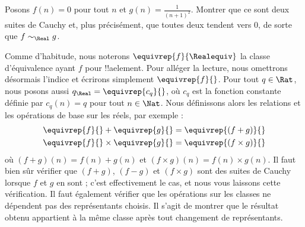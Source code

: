 \documentclass[../../../include/open-logic-section]{subfiles}
\begin{document}
\begin{prob}
Posons $f(n)=0$ pour tout $n$ et $g(n)=\frac{1}{(n+1)^2}$.
Montrer que ce sont deux suites de Cauchy et, plus précisément, que
toutes deux tendent vers $0$, de sorte que $f\sim_\Real g$.
\end{prob}

Comme d'habitude, nous noterons $\equivrep{f}{\Realequiv}$ la classe
d'équivalence ayant $f$ pour !!a{element}. Pour alléger la lecture,
nous omettrons désormais l'indice et écrirons simplement
$\equivrep{f}{}$. Pour tout $q\in\Rat$, nous posons aussi
$q_\Real=\equivrep{c_q}{}$, où $c_q$ est la fonction constante définie
par $c_q(n)=q$ pour tout $n\in\Nat$. Nous définissons alors les
relations et les opérations de base sur les réels, par exemple :
\begin{align*}
\equivrep{f}{}+\equivrep{g}{}&=\equivrep{(f+g)}{}\\
\equivrep{f}{}\times\equivrep{g}{}&=\equivrep{(f\times g)}{}
\end{align*}
où $(f+g)(n)=f(n)+g(n)$ et $(f\times g)(n)=f(n)\times g(n)$.
Il faut bien sûr vérifier que $(f+g)$, $(f-g)$ et $(f\times g)$ sont
des suites de Cauchy lorsque $f$ et $g$ en sont ; c'est effectivement
le cas, et nous vous laissons cette vérification.
Il faut également vérifier que les opérations sur les classes ne
dépendent pas des représentants choisis. Il s'agit de montrer que
le résultat obtenu appartient à la même classe après tout changement
de représentants.
%
\end{document}
